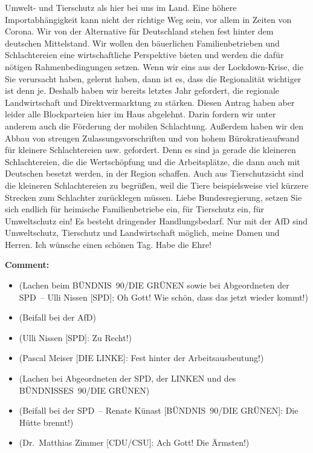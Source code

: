 \documentclass{article}
\begin{document}
Umwelt- und Tierschutz als hier bei uns im Land. Eine höhere Importabhängigkeit kann nicht der richtige Weg sein, vor allem in Zeiten von Corona. Wir von der Alternative für Deutschland stehen fest hinter dem deutschen Mittelstand.  Wir wollen den bäuerlichen Familienbetrieben und Schlachtereien eine wirtschaftliche Perspektive bieten und werden die dafür nötigen Rahmenbedingungen setzen. Wenn wir eins aus der Lockdown-Krise, die Sie verursacht haben, gelernt haben, dann ist es, dass die Regionalität wichtiger ist denn je. Deshalb haben wir bereits letztes Jahr gefordert, die regionale Landwirtschaft und Direktvermarktung zu stärken. Diesen Antrag haben aber leider alle Blockparteien hier im Haus abgelehnt.  Darin fordern wir unter anderem auch die Förderung der mobilen Schlachtung. Außerdem haben wir den Abbau von strengen Zulassungsvorschriften und von hohem Bürokratieaufwand für kleinere Schlachtereien usw. gefordert. Denn es sind ja gerade die kleineren Schlachtereien, die die Wertschöpfung und die Arbeitsplätze, die dann auch mit Deutschen besetzt werden, in der Region schaffen. Auch aus Tierschutzsicht sind die kleineren Schlachtereien zu begrüßen, weil die Tiere beispielsweise viel kürzere Strecken zum Schlachter zurücklegen müssen. Liebe Bundesregierung, setzen Sie sich endlich für heimische Familienbetriebe ein, für Tierschutz ein, für Umweltschutz ein! Es besteht dringender Handlungsbedarf. Nur mit der AfD sind Umweltschutz, Tierschutz und Landwirtschaft möglich, meine Damen und Herren.  Ich wünsche einen schönen Tag. Habe die Ehre!  

\noindent\textbf{Comment:}
\begin{itemize}
    \setlength\itemsep{-3pt}
    \item (Lachen beim BÜNDNIS 90/DIE GRÜNEN sowie bei Abgeordneten der SPD – Ulli Nissen [SPD]: Oh Gott! Wie schön, dass das jetzt wieder kommt!)
    \setlength\itemsep{-3pt}
    \item (Beifall bei der AfD)
    \setlength\itemsep{-3pt}
    \item (Ulli Nissen [SPD]: Zu Recht!)
    \setlength\itemsep{-3pt}
    \item (Pascal Meiser [DIE LINKE]: Fest hinter der Arbeitsausbeutung!)
    \setlength\itemsep{-3pt}
    \item (Lachen bei Abgeordneten der SPD, der LINKEN und des BÜNDNISSES 90/DIE GRÜNEN)
    \setlength\itemsep{-3pt}
    \item (Beifall bei der SPD – Renate Künast [BÜNDNIS 90/DIE GRÜNEN]: Die Hütte brennt!)
    \setlength\itemsep{-3pt}
    \item (Dr. Matthias Zimmer [CDU/CSU]: Ach Gott! Die Ärmsten!)
\end{itemize}
\end{document}
